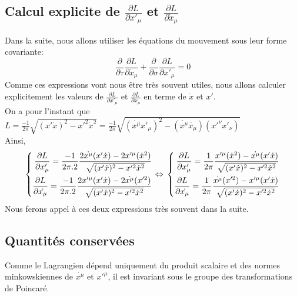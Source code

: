 \documentclass[a4paper,12pt]{article}
\def\xmu{x^\mu}
\begin{document}
\subsection{Calcul explicite de $\frac{\partial L}{\partial x'_{\mu}}$ et $\frac{\partial L}{\partial \dot x_{\mu}}$}
Dans la suite, nous allons utiliser les équations du mouvement sous leur forme covariante:
$$\frac{\partial}{\partial \tau}\frac{\partial L}{\partial \dot x_{\mu}}+\frac{\partial}{\partial \sigma}\frac{\partial L}{\partial  x'_{\mu}}=0$$
Comme ces expressions vont nous être très souvent utiles, nous allons calculer explicitement les valeurs de $\frac{\partial L}{\partial x'_{\mu}}$ et $\frac{\partial L}{\partial \dot x_{\mu}}$ en terme de $\dot{x}$ et $x'$.\\
On a pour l'instant que $L=\frac{-1}{2\pi}\sqrt{(x'\dot{x})^2-x'^2\dot{x}^2}=\frac{-1}{2\pi}\sqrt{(\dot{\xmu}x'_\mu)^2-(\dot{\xmu}\dot{x_\mu})(x'^\nu x'_\nu)}$\\
Ainsi,
\begin{equation}
	\left\lbrace 
	\begin{aligned}
	\frac{\partial L}{\partial x'_\mu }=\frac{-1}{2\pi.2}\frac{2\dot{\xmu}(x'\dot{x})-2x'^\mu (\dot{x}^2)}{\sqrt{(x'\dot{x})^2-x'^2\dot{x}^2}}\\
	\frac{\partial L}{\partial \dot{x_\mu}}=\frac{-1}{2\pi.2}\frac{2x'^\mu(x'\dot{x})-2\dot{\xmu} (x'^2)}{\sqrt{(x'\dot{x})^2-x'^2\dot{x}^2}}\\
	\end{aligned} 
	\right. 
	\Leftrightarrow\\
	\left\lbrace
	\begin{aligned}
	\frac{\partial L}{\partial x'_\mu }=\frac{1}{2\pi}\frac{x'^\mu (\dot{x}^2)-\dot{\xmu}(x'\dot{x})}{\sqrt{(x'\dot{x})^2-x'^2\dot{x}^2}}\\
	\frac{\partial L}{\partial \dot{x_\mu}}=\frac{1}{2\pi}\frac{\dot{\xmu} (x'^2)-x'^\mu(x'\dot{x})}{\sqrt{(x'\dot{x})^2-x'^2\dot{x}^2}}\\
	\end{aligned}
	\right.
\end{equation}
Nous ferons appel à ces deux expressions très souvent dans la suite.
\subsection{Quantités conservées}
Comme le Lagrangien dépend uniquement du produit scalaire et des normes minkowskiennes de $\dot{x^{\mu}}$ et $x'^{\mu}$, il est invariant sous le groupe des transformations de Poincaré.
\end{document}
